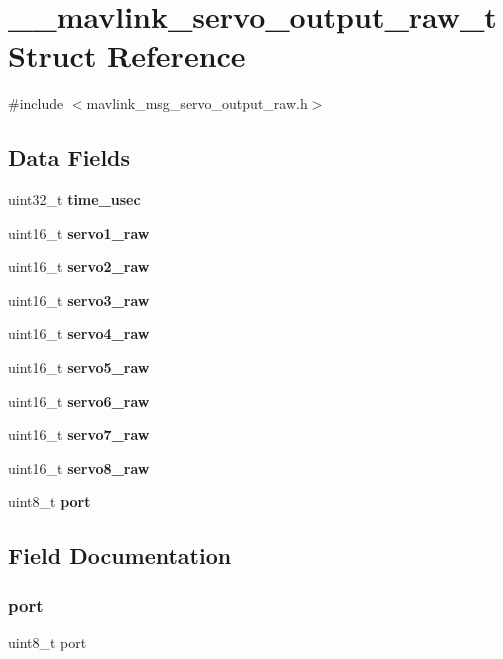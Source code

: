 \section{\+\_\+\+\_\+mavlink\+\_\+servo\+\_\+output\+\_\+raw\+\_\+t Struct Reference}
\label{struct____mavlink__servo__output__raw__t}


{\ttfamily \#include $<$mavlink\+\_\+msg\+\_\+servo\+\_\+output\+\_\+raw.\+h$>$}

\subsection*{Data Fields}
\begin{DoxyCompactItemize}
\item 
uint32\+\_\+t \textbf{ time\+\_\+usec}
\item 
uint16\+\_\+t \textbf{ servo1\+\_\+raw}
\item 
uint16\+\_\+t \textbf{ servo2\+\_\+raw}
\item 
uint16\+\_\+t \textbf{ servo3\+\_\+raw}
\item 
uint16\+\_\+t \textbf{ servo4\+\_\+raw}
\item 
uint16\+\_\+t \textbf{ servo5\+\_\+raw}
\item 
uint16\+\_\+t \textbf{ servo6\+\_\+raw}
\item 
uint16\+\_\+t \textbf{ servo7\+\_\+raw}
\item 
uint16\+\_\+t \textbf{ servo8\+\_\+raw}
\item 
uint8\+\_\+t \textbf{ port}
\end{DoxyCompactItemize}


\subsection{Field Documentation}
\mbox{\label{struct____mavlink__servo__output__raw__t_a2fa54f9024782843172506fadbee2ac8}} 
\subsubsection{port}
{\footnotesize\ttfamily uint8\+\_\+t port}

